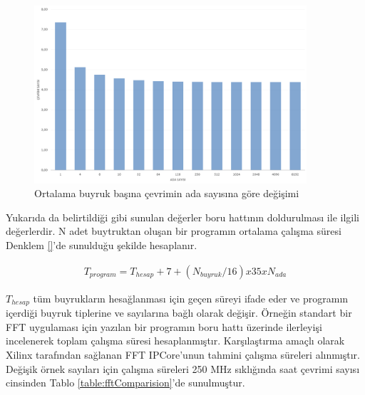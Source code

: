 \begin{figure}[ht]
\centering
\shorthandoff{=}
\includegraphics[width=0.9\textwidth]{gorsel/fillPipelineWorstVsNumOfIslands.png}
\shorthandoff{=}
\caption{Ortalama buyruk başına çevrimin ada sayısına göre değişimi}
\label{image:fillPipelineWorstVsNumOfIslands}
\end{figure}

Yukarıda da belirtildiği gibi sunulan değerler boru hattının doldurulması ile ilgili değerlerdir. N adet buytruktan oluşan bir programın ortalama çalışma süresi Denklem \ref{}'de sunulduğu şekilde hesaplanır. \par

\begin{align} \label{equation:pipelineCycleEstimationWorstCase}
	T_{program}= T_{hesap} + 7 + (N_{buyruk}/16) x 35 x N_{ada}
\end{align}

$T_{hesap}$ tüm buyrukların hesağlanması için geçen süreyi ifade eder ve programın içerdiği buyruk tiplerine ve sayılarına bağlı olarak değişir. Örneğin standart bir FFT uygulaması için yazılan bir programın boru hattı üzerinde ilerleyişi incelenerek toplam çalışma süresi hesaplanmıştır. Karşılaştırma amaçlı olarak Xilinx tarafından sağlanan FFT IPCore'unun tahmini çalışma süreleri alınmıştır. Değişik örnek sayıları için çalışma süreleri 250 MHz sıklığında saat çevrimi sayısı cinsinden Tablo \ref{table:fftComparision}'de sunulmuştur.

